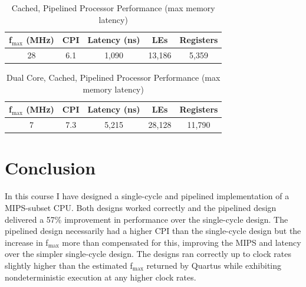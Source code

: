 \documentclass[12pt]{article}
\begin{document}
\begin{table}
\begin{center}

  \caption{Cached, Pipelined Processor Performance (max memory latency)}
  \begin{tabular}{| c | c | c | c | c |}
  \hline
  f$_{\textrm{max}}$ (MHz) & CPI & Latency (ns) & LEs & Registers \\ \hline
 28 & 6.1 & 1,090 & 13,186 & 5,359 \\ \hline
  \end{tabular}
  \end{center}

  \label{tab:perf_cache}
\end{table}



\begin{table}
\begin{center}

  \caption{Dual Core, Cached, Pipelined Processor Performance (max memory latency)}
  \begin{tabular}{| c | c | c | c | c |}
  \hline
  f$_{\textrm{max}}$ (MHz) & CPI & Latency (ns) & LEs & Registers \\ \hline
 7 & 7.3 & 5,215 & 28,128 & 11,790 \\ \hline
  \end{tabular}
  \end{center}

  \label{tab:perf_dual}
\end{table}



  \section{Conclusion}

In this course I have designed a single-cycle and pipelined implementation of a MIPS-subset CPU. Both designs worked correctly and the pipelined design delivered a 57\% improvement in performance over the single-cycle design. The pipelined design necessarily had a higher CPI than the single-cycle design but the increase in f$_{\textrm{max}}$ more than compensated for this, improving the MIPS and latency over the simpler single-cycle design. The designs ran correctly up to clock rates slightly higher than the estimated f$_{\textrm{max}}$ returned by Quartus while exhibiting nondeterministic execution at any higher clock rates.\\
\end{document}
